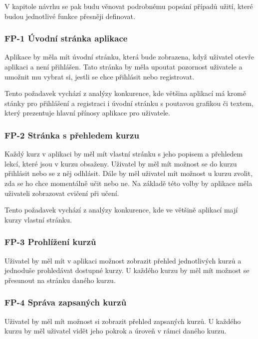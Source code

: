 V kapitole návrhu se pak budu věnovat podrobnému popsání případů užití, které budou jednotlivé funkce přesněji definovat.

\subsubsection{FP-1 Úvodní stránka aplikace}

Aplikace by měla mít úvodní stránku, která bude zobrazena, když uživatel otevře aplikaci a není přihlášen. Tato stránka by měla upoutat pozornost uživatele a umožnit mu vybrat si, jestli se chce přihlásit nebo registrovat.

Tento požadavek vychází z analýzy konkurence, kde většina aplikací má kromě stánky pro přihlášení a registraci i úvodní stránku s poutavou grafikou či textem, který prezentuje hlavní přínosy aplikace pro uživatele.

\subsubsection{FP-2 Stránka s přehledem kurzu}

Každý kurz v aplikaci by měl mít vlastní stránku s jeho popisem a přehledem lekcí, které jsou v kurzu obsaženy. Uživatel by měl mít možnost se do kurzu přihlásit nebo se z něj odhlásit. Dále by měl uživatel mít možnost u kurzu zvolit, zda se ho chce momentálně učit nebo ne. Na základě této volby by aplikace měla uživateli zobrazovat cvičení při učení.

Tento požadavek vychází z analýzy konkurence, kde ve většině aplikací mají kurzy vlastní stránku.

\subsubsection{FP-3 Prohlížení kurzů}

Uživatel by měl mít v aplikaci možnost zobrazit přehled jednotlivých kurzů a jednoduše prohledávat dostupné kurzy. U každého kurzu by měl mít možnost se přesunout na stránku daného kurzu.

\subsubsection{FP-4 Správa zapsaných kurzů}

Uživatel by měl mít možnost si zobrazit přehled zapsaných kurzů. U každého kurzu by měl uživatel vidět jeho pokrok a úroveň v rámci daného kurzu. 

